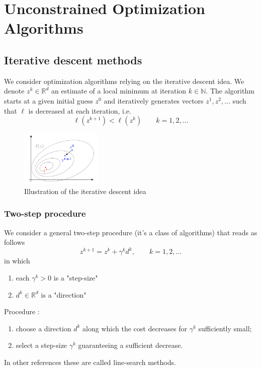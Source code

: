 \documentclass[openany]{book}
\newcommand{\R}{\mathbb{R}}               %
\newcommand{\N}{\mathbb{N}}               %
\theoremstyle{definition}
\theoremstyle{remark}
\begin{document}
\section{Unconstrained Optimization Algorithms}
\subsection{Iterative descent methods}
We consider optimization algorithms relying on the iterative descent idea. We denote $z^k\in\R^d$ an estimate of a local minimum at iteration $k\in\N$. The algorithm starts at a given initial guess $z^0$ and iteratively generates vectors $z^1,z^2,\dots$ such that $\ell$ is decreased at each iteration, i.e. 
\[
    \ell(z^{k+1})<\ell(z^k) \qquad k = 1,2,\dots
\]
\begin{figure}[ht]
    \centering
    \includegraphics[width=0.35\textwidth]{descent}
    \caption{Illustration of the iterative descent idea}
\end{figure}
\subsubsection{Two-step procedure}
We consider a general two-step procedure (it's a class of algorithms) that reads as follows 
\[
    z^{k+1} = z^k+\gamma^k d^k, \qquad k=1,2,\dots
\]
in which 
\begin{enumerate}
    \item each $\gamma^k>0$ is a "step-size" 
    \item $d^k\in\R^d$ is a "direction"
\end{enumerate}
Procedure : 
\begin{enumerate}
    \item choose a direction $d^k$ along which the cost decreases for $\gamma^k$ sufficiently small;
    \item select a step-size $\gamma^k$ guaranteeing a sufficient decrease. 
\end{enumerate}
In other references these are called line-search methods.
\end{document}

